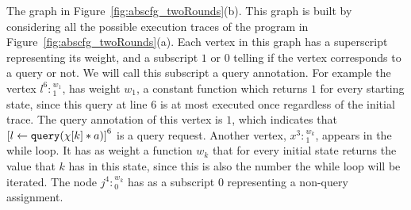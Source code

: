 \begin{example}[twoRounds]
      The graph in Figure~\ref{fig:abscfg_twoRounds}(b). This graph is built by considering all the possible execution traces of the program in   Figure~\ref{fig:abscfg_twoRounds}(a).
      Each vertex in this graph has a superscript representing its weight, and a subscript $1$ or $0$ telling if the vertex corresponds to a query or not. We will call this subscript a query annotation. 
      For example the vertex $l^{6}:{}^{w_1}_1$, 
      has weight $w_1$, a constant function which returns $1$ for every starting state, since 
      this query at line $6$ is at most executed once regardless of the initial trace.
      The query annotation of this vertex is $1$, which  indicates that 
      $\clabel{\assign{l}{\query(\chi[k] * a)}}^6$ is a query request.
      Another vertex, $x^{3}:{}^{w_k}_1$, appears in the while loop. 
      It has as weight a function $w_k$ that for every initial state returns the value that $k$ has in this state, since this is also the number the while loop will be iterated. 
      The node $j^{4}:{}^{w_k}_0$ has as a subscript $0$ representing a non-query assignment.
      

\end{example}

